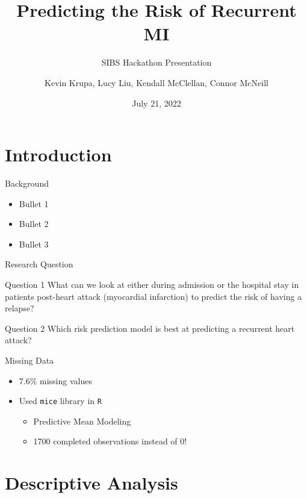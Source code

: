 \documentclass[
  ignorenonframetext,
]{beamer}
\title{Predicting the Risk of Recurrent MI}
\subtitle{SIBS Hackathon Presentation}
\author{Kevin Krupa, Lucy Liu, Kendall McClellan, Connor McNeill}
\date{July 21, 2022}
\institute{NCSU-Duke Summer Institute in Biostatistics}
\begin{document}
\frame{\titlepage}

\hypertarget{introduction}{%
\section{Introduction}\label{introduction}}

\begin{frame}{Background}
\protect\hypertarget{background}{}
\begin{itemize}
\item
  Bullet 1
\item
  Bullet 2
\item
  Bullet 3
\end{itemize}
\end{frame}

\begin{frame}{Research Question}
\protect\hypertarget{research-question}{}
\begin{block}{Question 1}
What can we look at either during admission or the hospital stay in patients post-heart attack (myocardial infarction) to predict the risk of having a relapse?
\end{block}

\begin{block}{Question 2}
Which risk prediction model is best at predicting a recurrent heart attack?
\end{block}
\end{frame}

\begin{frame}[fragile]{Missing Data}
\protect\hypertarget{missing-data}{}
\begin{itemize}
\item
  7.6\% missing values
\item
  Used \texttt{mice} library in \texttt{R}

  \begin{itemize}
  \item
    Predictive Mean Modeling
  \item
    1700 completed observations instead of 0!
  \end{itemize}
\end{itemize}
\end{frame}

\hypertarget{descriptive-analysis}{%
\section{Descriptive Analysis}\label{descriptive-analysis}}
\end{document}
